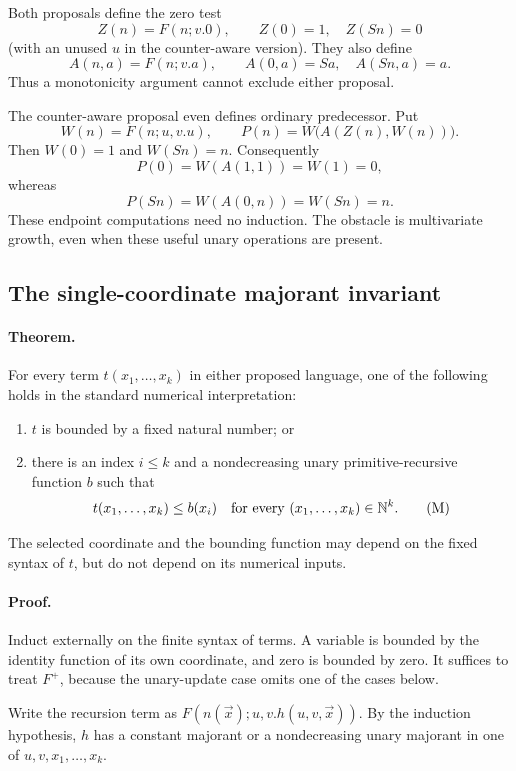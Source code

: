 Both proposals define the zero test
\[
 Z(n)=F(n;v.0),\qquad Z(0)=1,\quad Z(Sn)=0
\]
(with an unused $u$ in the counter-aware version).  They also define
\[
 A(n,a)=F(n;v.a),\qquad A(0,a)=Sa,\quad A(Sn,a)=a.
\]
Thus a monotonicity argument cannot exclude either proposal.

The counter-aware proposal even defines ordinary predecessor.  Put
\[
 W(n)=F(n;u,v.u),\qquad
 P(n)=W\bigl(A(Z(n),W(n))\bigr).
\]
Then $W(0)=1$ and $W(Sn)=n$.  Consequently
\[
 P(0)=W(A(1,1))=W(1)=0,
\]
whereas
\[
 P(Sn)=W(A(0,n))=W(Sn)=n.
\]
These endpoint computations need no induction.  The obstacle is
multivariate growth, even when these useful unary operations are present.

\subsection{The single-coordinate majorant invariant}

\paragraph{Theorem.}
For every term $t(x_1,\ldots,x_k)$ in either proposed language, one of
the following holds in the standard numerical interpretation:
\begin{enumerate}
\item $t$ is bounded by a fixed natural number; or
\item there is an index $i\leq k$ and a nondecreasing unary
primitive-recursive function $b$ such that
\[
 t(x_1,\ldots,x_k)\leq b(x_i)
 \quad\hbox{for every }(x_1,\ldots,x_k)\in\mathbb N^k.
 \tag{M}
\]
\end{enumerate}
The selected coordinate and the bounding function may depend on the
fixed syntax of $t$, but do not depend on its numerical inputs.

\paragraph{Proof.}
Induct externally on the finite syntax of terms.  A variable is bounded
by the identity function of its own coordinate, and zero is bounded by
zero.  It suffices to treat $F^{+}$, because the unary-update case omits
one of the cases below.

Write the recursion term as $F(n(\vec x);u,v.h(u,v,\vec x))$.
By the induction hypothesis, $h$ has a constant majorant or a
nondecreasing unary majorant in one of $u,v,x_1,\ldots,x_k$.


